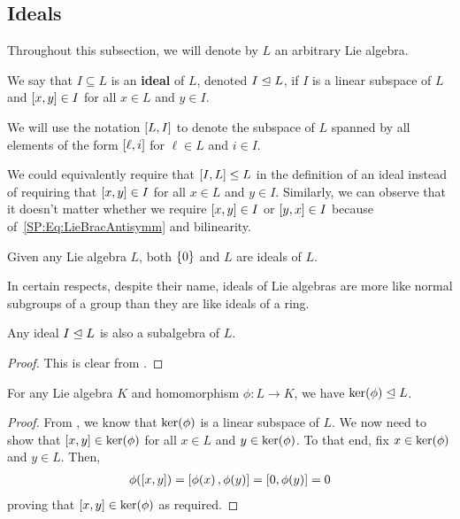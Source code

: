 \subsection{Ideals}

Throughout this subsection, we will denote by $L$ an arbitrary Lie algebra.

\begin{boxdefinition}[Ideal]\label{Ch1:Def:Ideal}
    We say that $I \subseteq L$ is an \textbf{ideal} of $L$, denoted $I \trianglelefteq L$, if $I$ is a linear subspace of $L$ and $\left[ x, y \right] \in I$ for all $x \in L$ and $y \in I$.
\end{boxdefinition}

\begin{boxconvention}
    We will use the notation $\left[ L, I \right]$ to denote the subspace of $L$ spanned by all elements of the form $\left[ \ell, i \right]$ for $\ell \in L$ and $i \in I$.
\end{boxconvention}

\begin{remark}
    We could equivalently require that $\left[ I, L \right]\leq L$ in the definition of an ideal instead of requiring that $\left[ x, y \right] \in I$ for all $x \in L$ and $y \in I$. Similarly, we can observe that it doesn't matter whether we require $\left[ x, y \right] \in I$ or $\left[ y, x \right] \in I$ because of~\eqref{SP:Eq:LieBracAntisymm} and bilinearity.
\end{remark}

\begin{boxexample}
    Given any Lie algebra $L$, both $\left\{ 0 \right\}$ and $L$ are ideals of $L$.
\end{boxexample}

In certain respects, despite their name, ideals of Lie algebras are more like normal subgroups of a group than they are like ideals of a ring.

\begin{boxlemma}\label{Ch1:Lemma:IdealSubalg}
    Any ideal $I \trianglelefteq L$ is also a subalgebra of $L$.
\end{boxlemma}
\begin{proof}
    This is clear from .
\end{proof}

\begin{boxlemma}
    For any Lie algebra $K$ and homomorphism $\phi : L \to K$, we have $\operatorname{ker}\!\left( \phi \right) \trianglelefteq L$.
\end{boxlemma}
\begin{proof}
    From , we know that $\operatorname{ker}\!\left( \phi \right)$ is a linear subspace of $L$. We now need to show that $\left[ x, y \right] \in \operatorname{ker}\!\left( \phi \right)$ for all $x \in L$ and $y \in \operatorname{ker}\!\left( \phi \right)$. To that end, fix $x \in \operatorname{ker}\!\left( \phi \right)$ and $y \in L$. Then,
    \begin{align*}
        \phi\!\left( \left[ x, y \right] \right) = \left[ \phi\!\left( x \right), \phi\!\left( y \right) \right] = \left[ 0, \phi\!\left( y \right) \right] = 0
    \end{align*}
    proving that $\left[ x, y \right] \in \operatorname{ker}\!\left( \phi \right)$ as required.
\end{proof}

